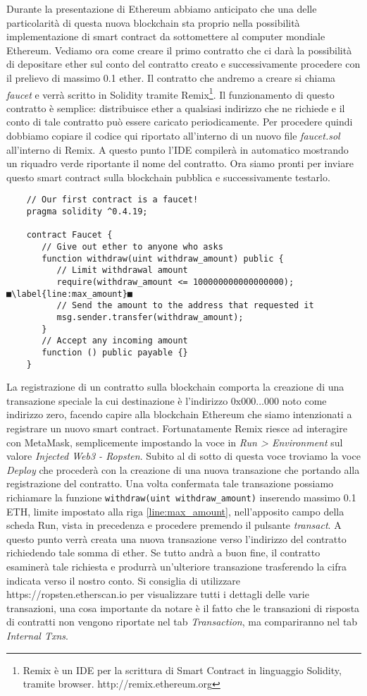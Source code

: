 Durante la presentazione di Ethereum abbiamo anticipato che una delle particolarità di questa nuova blockchain sta proprio nella possibilità implementazione di smart contract da sottomettere al computer mondiale Ethereum. Vediamo ora come creare il primo contratto che ci darà la possibilità di depositare ether sul conto del contratto creato e successivamente procedere con il prelievo di massimo 0.1 ether. Il contratto che andremo a creare si chiama \textit{faucet} e verrà scritto in Solidity tramite Remix\footnote{Remix è un IDE per la scrittura di Smart Contract in linguaggio Solidity, tramite browser. http://remix.ethereum.org}. Il funzionamento di questo contratto è semplice: distribuisce ether a qualsiasi indirizzo che ne richiede e il conto di tale contratto può essere caricato periodicamente. Per procedere quindi dobbiamo copiare il codice qui riportato all'interno di un nuovo file \textit{faucet.sol} all'interno di Remix. A questo punto l'IDE compilerà in automatico mostrando un riquadro verde riportante il nome del contratto. Ora siamo pronti per inviare questo smart contract sulla blockchain pubblica e successivamente testarlo.
\begin{lstlisting}
	// Our first contract is a faucet!
	pragma solidity ^0.4.19;
	
	contract Faucet {
	   // Give out ether to anyone who asks
	   function withdraw(uint withdraw_amount) public {
	      // Limit withdrawal amount
	      require(withdraw_amount <= 100000000000000000);	■\label{line:max_amount}■
	      // Send the amount to the address that requested it
	      msg.sender.transfer(withdraw_amount);
	   }
	   // Accept any incoming amount
	   function () public payable {}
	}
\end{lstlisting}
La registrazione di un contratto sulla blockchain comporta la creazione di una transazione speciale la cui destinazione è l'indirizzo $0\text{x}000 \dots 000$ noto come indirizzo zero, facendo capire alla blockchain Ethereum che siamo intenzionati a registrare un nuovo smart contract. Fortunatamente Remix riesce ad interagire con MetaMask, semplicemente impostando la voce in \textit{Run > Environment} sul valore \textit{Injected Web3 - Ropsten}. Subito al di sotto di questa voce troviamo la voce \textit{Deploy} che procederà con la creazione di una nuova transazione che portando alla registrazione del contratto. Una volta confermata tale transazione possiamo richiamare la funzione \lstinline|withdraw(uint withdraw_amount)| inserendo massimo 0.1 ETH, limite impostato alla riga \ref{line:max_amount}, nell'apposito campo della scheda Run, vista in precedenza e procedere premendo il pulsante \textit{transact}. A questo punto verrà creata una nuova transazione verso l'indirizzo del contratto richiedendo tale somma di ether. Se tutto andrà a buon fine, il contratto esaminerà tale richiesta e produrrà un'ulteriore transazione trasferendo la cifra indicata verso il nostro conto. Si consiglia di utilizzare https://ropsten.etherscan.io per visualizzare tutti i dettagli delle varie transazioni, una cosa importante da notare è il fatto che le transazioni di risposta di contratti non vengono riportate nel tab \textit{Transaction}, ma compariranno nel tab \textit{Internal Txns}.

